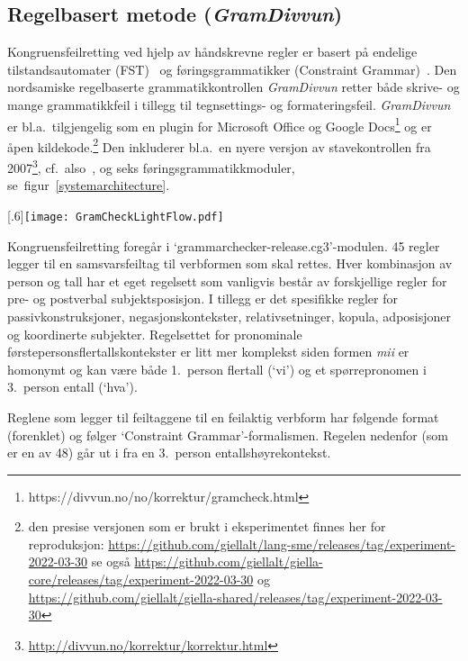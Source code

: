 \documentclass{flammie}
\begin{document}
\subsection{Regelbasert metode (\textit{GramDivvun})}

Kongruensfeilretting ved hjelp av håndskrevne regler er basert på endelige
tilstandsautomater (FST)~\cite{beesley2003finite,Pirinen2014state} og
føringsgrammatikker (Constraint Grammar)~\cite{karlsson1990constraint}.  Den
nordsamiske regelbaserte grammatikkontrollen \textit{GramDivvun} retter både
skrive- og mange grammatikkfeil i tillegg til tegnsettings- og formateringsfeil.
\textit{GramDivvun} er bl.a.\ tilgjengelig som en plugin for Microsoft Office og
Google Docs\footnote{https://divvun.no/no/korrektur/gramcheck.html} og er åpen
kildekode.\footnote{den presise versjonen som er brukt i eksperimentet finnes
her for reproduksjon:
\url{https://github.com/giellalt/lang-sme/releases/tag/experiment-2022-03-30} se
også
\url{https://github.com/giellalt/giella-core/releases/tag/experiment-2022-03-30}
og
\url{https://github.com/giellalt/giella-shared/releases/tag/experiment-2022-03-30}}
Den inkluderer bl.a.\ en nyere versjon av stavekontrollen fra
2007\footnote{\url{http://divvun.no/korrektur/korrektur.html}}, cf.\
also~\cite{Gaup2005xerox}, og seks føringsgrammatikkmoduler, se\
figur~\ref{systemarchitecture}.

    \begin{figure*}[ht]
    \begin{center}
    \scalebox{.6}[.6]{\texttt{[image: GramCheckLightFlow.pdf]}}
    \caption{Modulær struktur av \textit{GramDivvun}\label{systemarchitecture}}
    \end{center}
    \end{figure*}

Kongruensfeilretting foregår i `grammarchecker-release.cg3'-modulen.  45 regler
legger til en samsvarsfeiltag til verbformen som skal rettes. Hver kombinasjon
av person og tall har et eget regelsett som vanligvis består av forskjellige
regler for pre- og postverbal subjektsposisjon.  I tillegg er det spesifikke
regler for passivkonstruksjoner, negasjonskontekster, relativsetninger, kopula,
adposisjoner og koordinerte subjekter.  Regelsettet for pronominale
førstepersonsflertallskontekster er litt mer komplekst siden formen \textit{mii}
er homonymt og kan være både 1.\ person flertall (`vi') og et spørrepronomen i
3.\ person entall (`hva').

Reglene som legger til feiltaggene til en feilaktig verbform har følgende format
(forenklet) og følger `Constraint Grammar'-formalismen. Regelen nedenfor (som er
en av 48) går ut i fra en 3.\ person entallshøyrekontekst.
\end{document}
